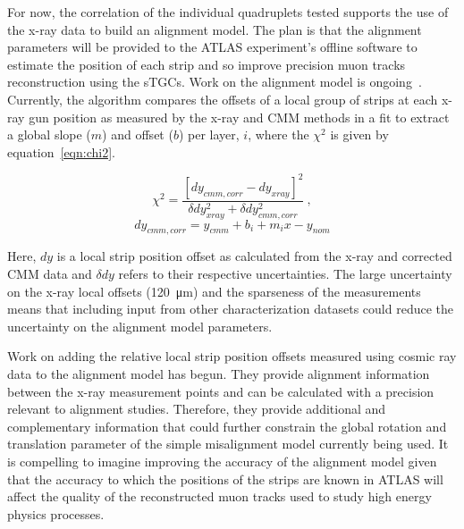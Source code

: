 For now, the correlation of the individual quadruplets tested supports the use of the x-ray data to build an alignment model. The plan is that the alignment parameters will be provided to the ATLAS experiment's offline software to estimate the position of each strip and so improve precision muon tracks reconstruction using the sTGCs. Work on the alignment model is ongoing~\cite{lefebvre_precision_2020}. Currently, the algorithm compares the offsets of a local group of strips at each x-ray gun position as measured by the x-ray and CMM methods in a fit to extract a global slope ($m$) and offset ($b$) per layer, $i$, where the $\chi^2$ is given by equation~\ref{eqn:chi2}.

\begin{equation}
    \chi^2 = \frac{\left[dy_{cmm, corr} - dy_{xray}\right]^2}{\delta dy_{xray}^2 + \delta dy_{cmm, corr}^2}\:,
    \label{eqn:chi2}  
\end{equation}
\begin{equation}
    dy_{cmm, corr} = y_{cmm} + b_i + m_{i}x - y_{nom}
    \label{eqn:dy_cmm_corr}
\end{equation}

Here, $dy$ is a local strip position offset as calculated from the x-ray and corrected CMM data and $\delta dy$ refers to their respective uncertainties. The large uncertainty on the x-ray local offsets (\SI{120}{\micro\meter}) and the sparseness of the measurements means that including input from other characterization datasets could reduce the uncertainty on the alignment model parameters. 

Work on adding the relative local strip position offsets measured using cosmic ray data to the alignment model has begun. They provide alignment information between the x-ray measurement points and can be calculated with a precision relevant to alignment studies. Therefore, they provide additional and complementary information that could further constrain the global rotation and translation parameter of the simple misalignment model currently being used. It is compelling to imagine improving the accuracy of the alignment model given that the accuracy to which the positions of the strips are known in ATLAS will affect the quality of the reconstructed muon tracks used to study high energy physics processes.

